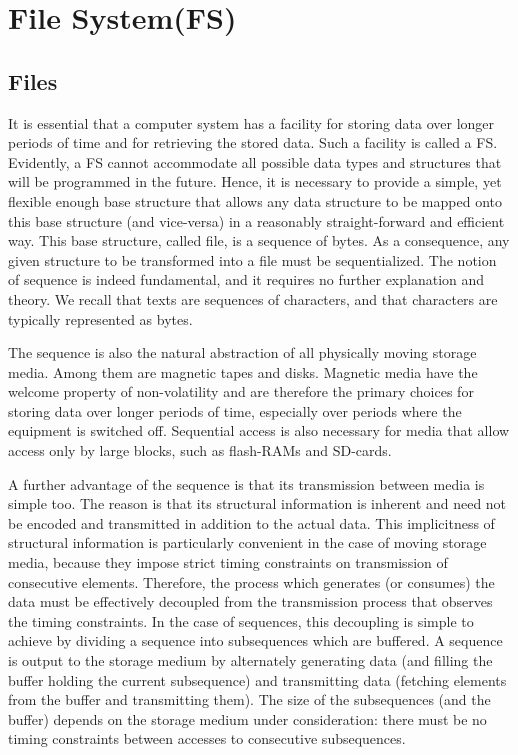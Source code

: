 \chapter{File System(FS)}
\label{ch:FS}
\section{Files}
It is essential that a computer system has a facility for storing data over longer periods of time
and for retrieving the stored data. Such a facility is called a FS. Evidently, a FS
cannot accommodate all possible data types and structures that will be programmed in the future.
Hence, it is necessary to provide a simple, yet flexible enough base structure that allows any data
structure to be mapped onto this base structure (and vice-versa) in a reasonably straight-forward
and efficient way. This base structure, called file, is a sequence of bytes. As a consequence, any
given structure to be transformed into a file must be sequentialized. The notion of sequence is
indeed fundamental, and it requires no further explanation and theory. We recall that texts are
sequences of characters, and that characters are typically represented as bytes.

The sequence is also the natural abstraction of all physically moving storage media. Among them
are magnetic tapes and disks. Magnetic media have the welcome property of non-volatility and
are therefore the primary choices for storing data over longer periods of time, especially over
periods where the equipment is switched off. Sequential access is also necessary for media that
allow access only by large blocks, such as flash-RAMs and SD-cards.

A further advantage of the sequence is that its transmission between media is simple too. The
reason is that its structural information is inherent and need not be encoded and transmitted in
addition to the actual data. This implicitness of structural information is particularly convenient in
the case of moving storage media, because they impose strict timing constraints on transmission
of consecutive elements. Therefore, the process which generates (or consumes) the data must
be effectively decoupled from the transmission process that observes the timing constraints. In
the case of sequences, this decoupling is simple to achieve by dividing a sequence into
subsequences which are buffered. A sequence is output to the storage medium by alternately
generating data (and filling the buffer holding the current subsequence) and transmitting data
(fetching elements from the buffer and transmitting them). The size of the subsequences (and the
buffer) depends on the storage medium under consideration: there must be no timing constraints
between accesses to consecutive subsequences.


